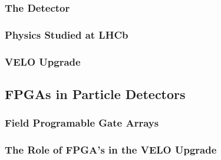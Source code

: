 		\subsubsection{The Detector}

		\subsubsection{Physics Studied at LHCb}
		\subsubsection{VELO Upgrade}

	\subsection{FPGAs in Particle Detectors}

		\subsubsection{Field Programable Gate Arrays}

		\subsubsection{The Role of FPGA's in the VELO Upgrade}